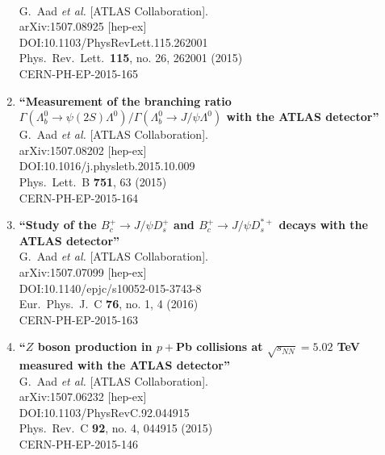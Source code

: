 \documentclass{article}
\begin{document}
\begin{enumerate}
  \\{}G.~Aad {\it et al.} [ATLAS Collaboration].
  \\{}arXiv:1507.08925 [hep-ex]
  \\{}DOI:10.1103/PhysRevLett.115.262001
  \\{}Phys.\ Rev.\ Lett.\  {\bf 115}, no. 26, 262001 (2015)
  \\{}CERN-PH-EP-2015-165
\item%
{\bf ``Measurement of the branching ratio $\Gamma(\Lambda_b^0 \rightarrow \psi(2S)\Lambda^0)/\Gamma(\Lambda_b^0 \rightarrow J/\psi\Lambda^0)$ with the ATLAS detector''}
  \\{}G.~Aad {\it et al.} [ATLAS Collaboration].
  \\{}arXiv:1507.08202 [hep-ex]
  \\{}DOI:10.1016/j.physletb.2015.10.009
  \\{}Phys.\ Lett.\ B {\bf 751}, 63 (2015)
  \\{}CERN-PH-EP-2015-164
\item%
{\bf ``Study of the $B_c^+ \rightarrow J/\psi D_s^+$ and $B_c^+ \rightarrow J/\psi D_s^{*+}$ decays with the ATLAS detector''}
  \\{}G.~Aad {\it et al.} [ATLAS Collaboration].
  \\{}arXiv:1507.07099 [hep-ex]
  \\{}DOI:10.1140/epjc/s10052-015-3743-8
  \\{}Eur.\ Phys.\ J.\ C {\bf 76}, no. 1, 4 (2016)
  \\{}CERN-PH-EP-2015-163
\item%
{\bf ``$Z$ boson production in $p+$Pb collisions at $\sqrt{s_{NN}}=5.02$ TeV measured with the ATLAS detector''}
  \\{}G.~Aad {\it et al.} [ATLAS Collaboration].
  \\{}arXiv:1507.06232 [hep-ex]
  \\{}DOI:10.1103/PhysRevC.92.044915
  \\{}Phys.\ Rev.\ C {\bf 92}, no. 4, 044915 (2015)
  \\{}CERN-PH-EP-2015-146

\end{enumerate}
\end{document}

